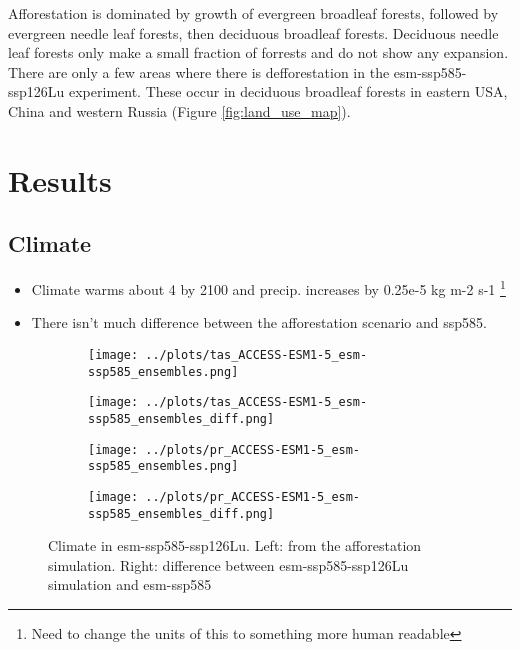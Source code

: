 \documentclass[]{article}
\begin{document}
Afforestation is dominated by growth of evergreen broadleaf forests, followed by evergreen needle leaf forests, then deciduous broadleaf forests.
Deciduous needle leaf forests only make a small fraction of forrests and do not show any expansion.
There are only a few areas where there is defforestation in the esm-ssp585-ssp126Lu experiment.
These occur in deciduous broadleaf forests in eastern USA, China and western Russia (Figure \ref{fig:land_use_map}).

\section{Results}

\subsection{Climate}

\begin{itemize}
    \item Climate warms about 4 \textcelsius{} by 2100 and precip. increases by 0.25e-5 kg m-2 s-1 \footnote{Need to change the units of this to something more human readable}
    \item There isn't much difference between the afforestation scenario and ssp585.
\end{itemize}

\begin{figure}[H]
    \centering
    \begin{subfigure}[b]{0.45\linewidth}
        \texttt{[image: ../plots/tas\_ACCESS-ESM1-5\_esm-ssp585\_ensembles.png]}
    \end{subfigure}
    \begin{subfigure}[b]{0.45\linewidth}
        \texttt{[image: ../plots/tas\_ACCESS-ESM1-5\_esm-ssp585\_ensembles\_diff.png]}
    \end{subfigure}
    \begin{subfigure}[b]{0.45\linewidth}
        \texttt{[image: ../plots/pr\_ACCESS-ESM1-5\_esm-ssp585\_ensembles.png]}
    \end{subfigure}
    \begin{subfigure}[b]{0.45\linewidth}
        \texttt{[image: ../plots/pr\_ACCESS-ESM1-5\_esm-ssp585\_ensembles\_diff.png]}
    \end{subfigure}
    \caption{Climate in esm-ssp585-ssp126Lu. Left: from the afforestation simulation. Right: difference between esm-ssp585-ssp126Lu simulation and esm-ssp585}
    \label{fig:climate}
\end{figure}
\end{document}
